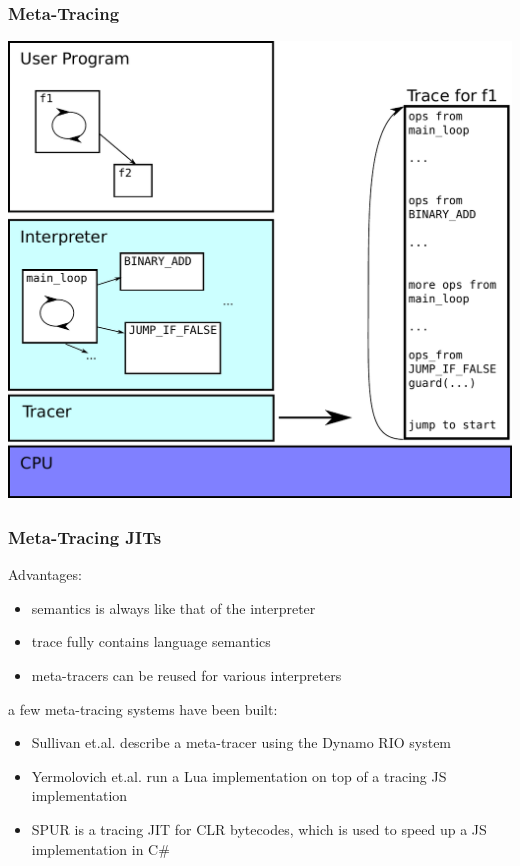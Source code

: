\documentclass[utf8x]{beamer}
\begin{document}
\begin{frame}
  \frametitle{Meta-Tracing}
  \includegraphics[scale=0.5]{figures/metatrace01.pdf}
\end{frame}

\begin{frame}
  \frametitle{Meta-Tracing JITs}
  \begin{block}{Advantages:}
    \begin{itemize}
        \item semantics is always like that of the interpreter
        \item trace fully contains language semantics
        \item meta-tracers can be reused for various interpreters
    \end{itemize}
  \end{block}
  \pause
  a few meta-tracing systems have been built:
  \begin{itemize}
      \item Sullivan et.al. describe a meta-tracer using the Dynamo RIO system
      \item Yermolovich et.al. run a Lua implementation on top of a tracing JS implementation
      \item SPUR is a tracing JIT for CLR bytecodes, which is used to speed up a JS implementation in C\#
  \end{itemize}
\end{frame}
\end{document}
